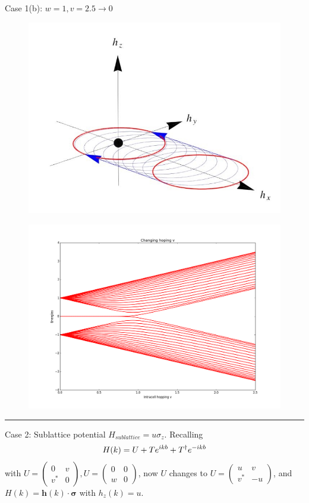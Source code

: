 \documentclass[letterpaper,10pt,english]{sphinxmanual}
\begin{document}
Case 1(b): \(w=1, v=2.5\to 0\)
\begin{figure}[htbp]
\centering

\includegraphics[width=0.700\linewidth]{c.jpg}
\end{figure}
\begin{figure}[htbp]
\centering

\includegraphics[width=0.700\linewidth]{figure_3.png}
\end{figure}


\bigskip\hrule{}\bigskip


Case 2: Sublattice potential \(H_{sublattice}=u\sigma_z\). Recalling
\begin{gather}
\begin{split}H(k)=U+Te^{ikb}+T^\dagger e^{-ikb}\end{split}\notag
\end{gather}
with
\(U=\begin{pmatrix}0&v\\v^*&0\end{pmatrix},U=\begin{pmatrix}0&0\\w&0\end{pmatrix}\),
now \(U\) changes to
\(U=\begin{pmatrix}u&v\\v^*&-u\end{pmatrix}\), and
\(H(k)=\mathbf{h}(k)\cdot\mathbf{\sigma}\) with \(h_z(k)=u\).
\end{document}
